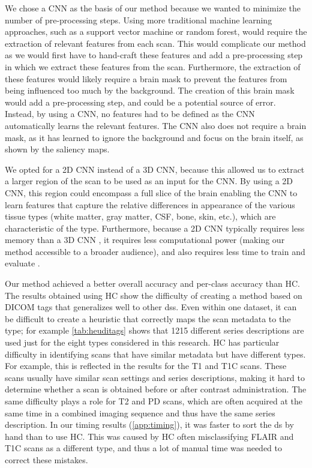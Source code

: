 We chose a \gls{CNN} as the basis of our method because we wanted to minimize the number of pre-processing steps.
Using more traditional machine learning approaches, such as a support vector machine or random forest, would require the extraction of relevant features from each \gls{scan}.
This would complicate our method as we would first have to hand-craft these features and add a pre-processing step in which we extract these features from the \gls{scan}.
Furthermore, the extraction of these features would likely require a brain mask to prevent the features from being influenced too much by the background.
The creation of this brain mask would add a pre-processing step, and could be a potential source of error.
Instead, by using a \gls{CNN}, no features had to be defined as the \gls{CNN} automatically learns the relevant features.
The \gls{CNN} also does not require a brain mask, as it has learned to ignore the background and focus on the brain itself, as shown by the saliency maps.

We opted for a 2D \gls{CNN} instead of a 3D \gls{CNN}, because this allowed us to extract a larger region of the \gls{scan} to be used as an input for the \gls{CNN}.
By using a 2D \gls{CNN}, this region could encompass a full slice of the brain enabling the \gls{CNN} to learn features that capture the relative differences in appearance of the various tissue types (white matter, gray matter, \acrshort{CSF}, bone, skin, etc.), which are characteristic of the \gls{type}.
Furthermore, because a 2D \gls{CNN} typically requires less memory than a 3D \gls{CNN} \autocite{prasoon2013deep}, it requires less computational power (making our method accessible to a broader audience), and also requires less time to train and evaluate \autocite{rongjian2014deep}.

Our method achieved a better overall accuracy and per-class accuracy than \gls{HC}.
The results obtained using \gls{HC} show the difficulty of creating a method based on \gls{DICOM} tags that generalizes well to other \glspl{ds}.
Even within one dataset, it can be difficult to create a heuristic that correctly maps the \gls{scan} metadata to the \gls{type}; for example \cref{tab:heuditags} shows that \num{1215} different series descriptions are used just for the eight \glspl{type} considered in this research.
\gls{HC} has particular difficulty in identifying \glspl{scan} that have similar metadata but have different \glspl{type}.
For example, this is reflected in the results for the \gls{T1} and \gls{T1C} \glspl{scan}.
These \glspl{scan} usually have similar scan settings and series descriptions, making it hard to determine whether a \gls{scan} is obtained before or after contrast administration.
The same difficulty plays a role for \gls{T2} and \gls{PD} \glspl{scan}, which are often acquired at the same time in a combined imaging sequence and thus have the same series description.
In our timing results (\cref{app:timing}), it was faster to sort the \gls{ds} by hand than to use \gls{HC}.
This was caused by \gls{HC} often misclassifying \gls{FLAIR} and \gls{T1C} \glspl{scan} as a different \gls{type}, and thus a lot of manual time was needed to correct these mistakes.

